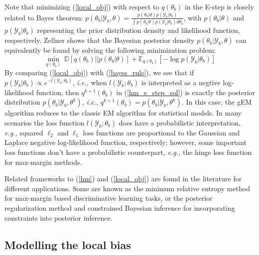 \documentclass{article}
\newcommand{\ie}[0]{\emph{i.e., }}
\newcommand{\eg}[0]{\emph{e.g., }}
\newcommand{\1}[0]{\ensuremath{\boldsymbol{1}}\xspace}
\begin{document}
Note that minimizing (\ref{local_obj}) with respect to $q(\theta_b)$ in the E-step is closely related to Bayes theorem: $p(\theta_b|\mathcal{Y}_b, \theta) = \frac{p(\theta_b|\theta)p(\mathcal{Y}_b|\theta_b)}{\int p(\theta_b|\theta)p(\mathcal{Y}_b|\theta_b)d\theta_b}$, with $p(\theta_b|\theta)$ and $p(\mathcal{Y}_b|\theta_b)$ representing the prior distribution density and likelihood function, respectively. Zellner  shows that the Bayesian posterior density $p(\theta_b|\mathcal{Y}_b, \theta)$ can equivalently be found by solving the following minimization problem:
\begin{equation}\label{bayes_rule}
\textstyle \min_{q(\theta_b)} ~\mathbb{D}[q(\theta_b)||p(\theta_b|\theta)] + \mathbb{E}_{q(\theta_b)}[-\log p(\mathcal{Y}_b|\theta_b)]
\end{equation}
By comparing (\ref{local_obj}) with (\ref{bayes_rule}), we see that if $p(\mathcal{Y}_b|\theta_b) \propto e^{-l(\mathcal{Y}_b; \theta_b)}$, \ie when $l(\mathcal{Y}_b; \theta_b)$ is interpreted as a negtive log-likelihood function, then $q^{k+1}(\theta_b)$ in (\ref{hm_e_step_sol}) is exactly the posterior distribution $p(\theta_b|\mathcal{Y}_b, \theta^k)$, \ie $q^{k+1}(\theta_b) = p(\theta_b|\mathcal{Y}_b, \theta^k)$. In this case, the gEM algorithm reduces to the classic EM algorithm for statistical models. In many scenarios the loss function $l(\mathcal{Y}_b; \theta_b)$ does have a probabilistic interpretation, \eg  squared $\ell_2$ and $\ell_1$ loss functions are proportional to the Gaussian and Laplace negative log-likelihood function, respectively; however, some important loss functions don't have a probabilistic counterpart, \eg the hinge loss function for max-margin methods.

Related frameworks to (\ref{hm}) and (\ref{local_obj}) are found in the literature for different applications. Some are known as the minimum relative entropy method \cite{Jaakkola1999, Zhu2012} for max-margin based discriminative learning tasks, or the posterior regularization method \cite{Ganchev2010} and constrained Bayesian inference \cite{Koyejo2013} for incorporating constraints into posterior inference.

\subsection{Modelling the local bias}\label{pADMM}
\end{document}

